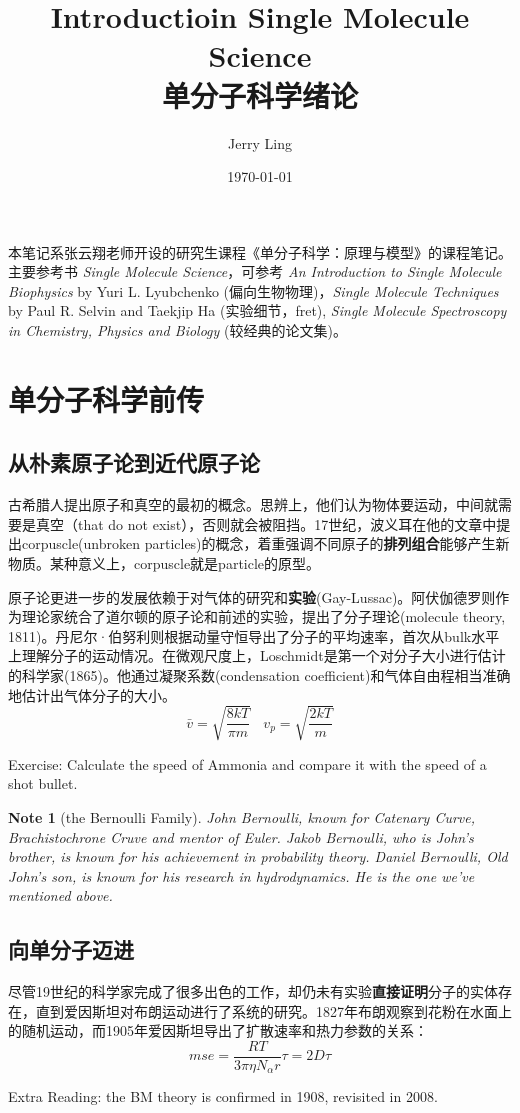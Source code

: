 \documentclass[12pt]{ctexart}%
\title{Introductioin Single Molecule Science\\单分子科学绪论}
\author{Jerry Ling}
\date{\today}
\newtheorem{note}{Note}
\begin{document}
\maketitle  %
本笔记系张云翔老师开设的研究生课程《单分子科学：原理与模型》的课程笔记。主要参考书 \textit{Single Molecule Science}，可参考 \textit{An Introduction to Single Molecule Biophysics} by Yuri L. Lyubchenko (偏向生物物理)，\textit{Single Molecule Techniques} by Paul R. Selvin and Taekjip Ha (实验细节，fret), \textit{Single Molecule Spectroscopy in Chemistry, Physics and Biology} (较经典的论文集)。

\section*{单分子科学前传}
\subsection*{从朴素原子论到近代原子论}
古希腊人提出原子和真空的最初的概念。思辨上，他们认为物体要运动，中间就需要是真空（that do not exist），否则就会被阻挡。17世纪，波义耳在他的文章中提出corpuscle(unbroken particles)的概念，着重强调不同原子的\textbf{排列组合}能够产生新物质。某种意义上，corpuscle就是particle的原型。
\par 原子论更进一步的发展依赖于对气体的研究和\textbf{实验}(Gay-Lussac)。阿伏伽德罗则作为理论家统合了道尔顿的原子论和前述的实验，提出了分子理论(molecule theory, 1811)。丹尼尔·伯努利则根据动量守恒导出了分子的平均速率，首次从bulk水平上理解分子的运动情况。在微观尺度上，Loschmidt是第一个对分子大小进行估计的科学家(1865)。他通过凝聚系数(condensation coefficient)和气体自由程相当准确地估计出气体分子的大小。
\begin{equation}
    \bar{v}=\sqrt{\frac{8kT}{\pi m}} \ \ \ \ v_p=\sqrt{\frac{2kT}{m}}
\end{equation}
\begin{framed}
    Exercise: Calculate the speed of Ammonia and compare it with the speed of a shot bullet.
\end{framed}
\begin{note}[the Bernoulli Family]
    John Bernoulli, known for Catenary Curve, Brachistochrone Cruve and mentor of Euler. Jakob Bernoulli, who is John's brother, is known for his achievement in probability theory. Daniel Bernoulli, Old John's son, is known for his research in hydrodynamics. He is the one we've mentioned above.
\end{note}
\subsection*{向单分子迈进}
尽管19世纪的科学家完成了很多出色的工作，却仍未有实验\textbf{直接证明}分子的实体存在，直到爱因斯坦对布朗运动进行了系统的研究。1827年布朗观察到花粉在水面上的随机运动，而1905年爱因斯坦导出了扩散速率和热力参数的关系：
\begin{equation}
    mse = \frac{RT}{3\pi\eta N_{\alpha} r}\tau = 2 D \tau
\end{equation}
\begin{framed}
    Extra Reading: the BM theory is confirmed in 1908, revisited in 2008. 
\end{framed}
\end{document}
